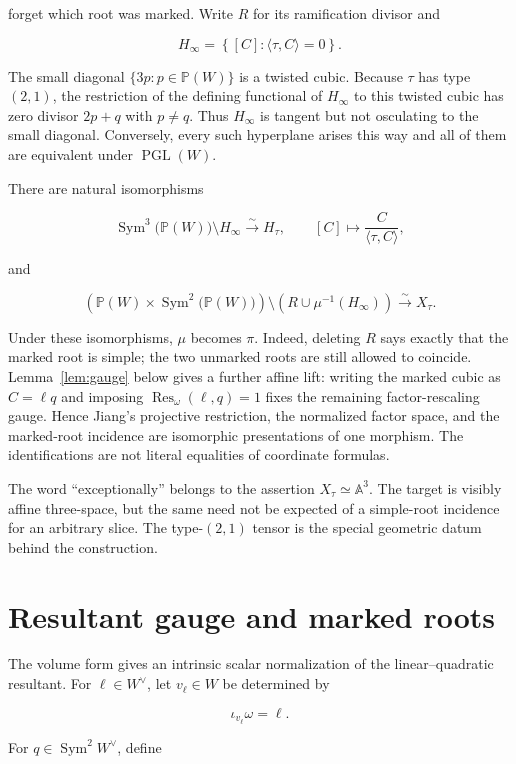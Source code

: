 \documentclass[11pt,a4paper]{article}
\theoremstyle{remark}
\DeclareMathOperator{\Sym}{Sym}
\DeclareMathOperator{\Res}{Res}
\newcommand{\A}{\mathbb A}
\newcommand{\PP}{\mathbb P}
\begin{document}
forget which root was marked.  Write $R$ for its ramification divisor and

\[
  H_\infty=\left\{[C]:\langle\tau,C\rangle=0\right\}.
\]

The small diagonal $\{3p:p\in\PP(W)\}$ is a twisted cubic.  Because $\tau$
has type $(2,1)$, the restriction of the defining functional of $H_\infty$
to this twisted cubic has zero divisor $2p+q$ with $p\ne q$.  Thus
$H_\infty$ is tangent but not osculating to the small diagonal.  Conversely,
every such hyperplane arises this way and all of them are equivalent under
$\operatorname{PGL}(W)$.

There are natural isomorphisms

\[
  \Sym^3\!\bigl(\PP(W)\bigr)\setminus H_\infty
  \xrightarrow{\sim}H_\tau,
  \qquad [C]\longmapsto
  \frac{C}{\langle\tau,C\rangle},
\]

and

\[
  \left(\PP(W)\times\Sym^2\!\bigl(\PP(W)\bigr)\right)
  \setminus\left(R\cup\mu^{-1}(H_\infty)\right)
  \xrightarrow{\sim}X_\tau.
\]

Under these isomorphisms, $\mu$ becomes $\pi$.  Indeed, deleting $R$ says
exactly that the marked root is simple; the two unmarked roots are still
allowed to coincide.  Lemma~\ref{lem:gauge} below gives a further affine lift:
writing the marked cubic as $C=\ell q$ and imposing
$\Res_\omega(\ell,q)=1$ fixes the remaining factor-rescaling gauge.  Hence
Jiang's projective restriction, the normalized factor space, and the
marked-root incidence are isomorphic presentations of one morphism.  The
identifications are not literal equalities of coordinate formulas.

The word ``exceptionally'' belongs to the assertion
$X_\tau\simeq\A^3$.  The target is visibly affine three-space, but the same
need not be expected of a simple-root incidence for an arbitrary slice.  The
type-$(2,1)$ tensor is the special geometric datum behind the construction.

\section{Resultant gauge and marked roots}

The volume form gives an intrinsic scalar normalization of the
linear--quadratic resultant.  For $\ell\in W^\vee$, let
$v_\ell\in W$ be determined by

\[
  \iota_{v_\ell}\omega=\ell.
\]

For $q\in\Sym^2W^\vee$, define
\end{document}
